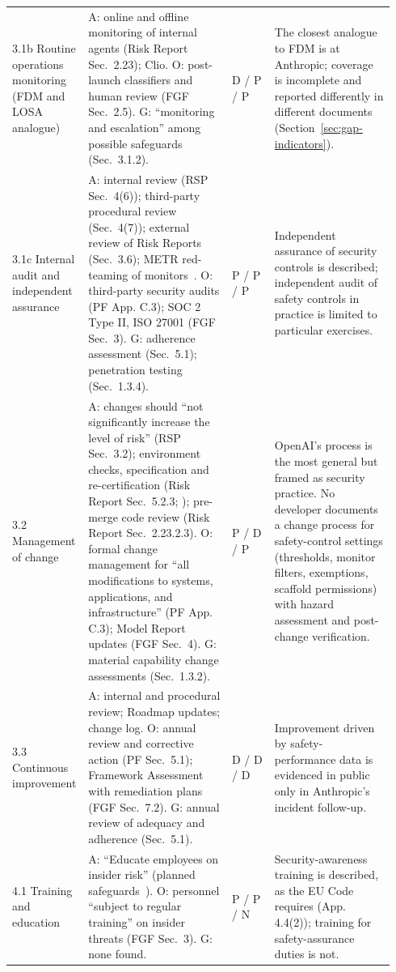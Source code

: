 \documentclass[11pt]{article}
\begin{document}
{\begin{longtable}{@{}>{\raggedright\arraybackslash}p{0.14\linewidth}>{\raggedright\arraybackslash}p{0.375\linewidth}>{\centering\arraybackslash}p{0.115\linewidth}>{\raggedright\arraybackslash}p{0.31\linewidth}@{}}
\addlinespace[2pt]
{}3.1b Routine operations monitoring (FDM and LOSA analogue) & A: online and offline monitoring of internal agents (Risk Report Sec.~2.23); Clio. O: post-launch classifiers and human review (FGF Sec.~2.5). G: ``monitoring and escalation'' among possible safeguards (Sec.~3.1.2). & D / P / P & The closest analogue to FDM is at Anthropic; coverage is incomplete and reported differently in different documents (Section~\ref{sec:gap-indicators}). \\
\addlinespace[2pt]
{}3.1c Internal audit and independent assurance & A: internal review (RSP Sec.~4(6)); third-party procedural review (Sec.~4(7)); external review of Risk Reports (Sec.~3.6); METR red-teaming of monitors~\cite{metr2026frr}. O: third-party security audits (PF App. C.3); SOC 2 Type II, ISO 27001 (FGF Sec.~3). G: adherence assessment (Sec.~5.1); penetration testing (Sec.~1.3.4). & P / P / P & Independent assurance of security controls is described; independent audit of safety controls in practice is limited to particular exercises. \\
\addlinespace[2pt]
{}3.2 Management of change & A: changes should ``not significantly increase the level of risk'' (RSP Sec.~3.2); environment checks, specification and re-certification (Risk Report Sec.~5.2.3; \cite{anthropic2026improving}); pre-merge code review (Risk Report Sec.~2.23.2.3). O: formal change management for ``all modifications to systems, applications, and infrastructure'' (PF App. C.3); Model Report updates (FGF Sec.~4). G: material capability change assessments (Sec.~1.3.2). & P / D / P & OpenAI's process is the most general but framed as security practice. No developer documents a change process for safety-control settings (thresholds, monitor filters, exemptions, scaffold permissions) with hazard assessment and post-change verification. \\
\addlinespace[2pt]
{}3.3 Continuous improvement & A: internal and procedural review; Roadmap updates; change log. O: annual review and corrective action (PF Sec.~5.1); Framework Assessment with remediation plans (FGF Sec.~7.2). G: annual review of adequacy and adherence (Sec.~5.1). & D / D / D & Improvement driven by safety-performance data is evidenced in public only in Anthropic's incident follow-up. \\
\addlinespace[2pt]
{}4.1 Training and education & A: ``Educate employees on insider risk'' (planned safeguards~\cite{anthropic2026rsppage}). O: personnel ``subject to regular training'' on insider threats (FGF Sec.~3). G: none found. & P / P / N & Security-awareness training is described, as the EU Code requires (App. 4.4(2)); training for safety-assurance duties is not. \\

\end{longtable}}
\end{document}
